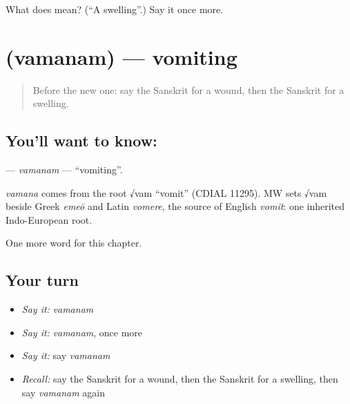 \begin{tcolorbox}[breakable,colback=teal!4,colframe=teal!35!black,title={Before you move on}]
What does  mean? (\textquotedblleft{}A swelling\textquotedblright{}.) Say it once more.
\end{tcolorbox}
\section[\texorpdfstring{\sk{वमनम्} (vamanam)}{वमनम् (vamanam)}]{ (vamanam) — vomiting}

\label{lesson:SA-C150-vamanam}



\begin{quote}
Before the new one: say the Sanskrit for a wound, then the Sanskrit for a swelling.
\end{quote}

\subsection*{You'll want to know: }
\textbf{} — \emph{vamanam} — \textquotedblleft{}vomiting\textquotedblright{}.

\begin{cousinweb}
\emph{vamana} comes from the root √vam \textquotedblleft{}vomit\textquotedblright{} (CDIAL 11295). MW sets √vam beside Greek \emph{emeō} and Latin \emph{vomere}, the source of English \emph{vomit}: one inherited Indo-European root.
\end{cousinweb}

\begin{grammarlens}[title={What you've built}]
One more word for this chapter.
\end{grammarlens}

\subsection*{Your turn}
\begin{itemize}
\raggedright
  \item \emph{Say it:} \emph{vamanam}
  \item \emph{Say it:} \emph{vamanam}, once more
  \item \emph{Say it:} say \emph{vamanam}
  \item \emph{Recall:} say the Sanskrit for a wound, then the Sanskrit for a swelling, then say \emph{vamanam} again
\end{itemize}

